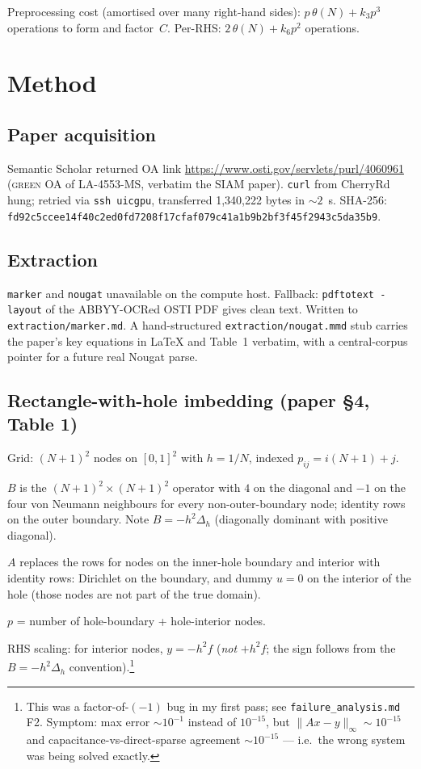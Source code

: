 \documentclass[11pt]{article}
\begin{document}
Preprocessing cost (amortised over many right-hand sides):
$p\,\theta(N) + k_3 p^3$ operations to form and factor~$C$. Per-RHS:
$2\,\theta(N) + k_6 p^2$ operations.

\section{Method}

\subsection{Paper acquisition}
Semantic Scholar returned OA link \url{https://www.osti.gov/servlets/purl/4060961}
(\textsc{green} OA of LA-4553-MS, verbatim the SIAM paper). \texttt{curl}
from CherryRd hung; retried via \texttt{ssh uicgpu}, transferred 1{,}340{,}222
bytes in ${\sim}2$~s. SHA-256:
\lstinline|fd92c5ccee14f40c2ed0fd7208f17cfaf079c41a1b9b2bf3f45f2943c5da35b9|.

\subsection{Extraction}
\texttt{marker} and \texttt{nougat} unavailable on the compute host.
Fallback: \texttt{pdftotext -layout} of the ABBYY-OCRed OSTI PDF gives
clean text. Written to \texttt{extraction/marker.md}. A hand-structured
\texttt{extraction/nougat.mmd} stub carries the paper's key equations in
LaTeX and Table~1 verbatim, with a central-corpus pointer for a future
real Nougat parse.

\subsection{Rectangle-with-hole imbedding (paper \S4, Table 1)}
Grid: $(N+1)^2$ nodes on $[0,1]^2$ with $h = 1/N$, indexed $p_{ij} = i(N+1)+j$.

$B$ is the $(N+1)^2 \times (N+1)^2$ operator with $4$ on the diagonal and
$-1$ on the four von Neumann neighbours for every non-outer-boundary
node; identity rows on the outer boundary. Note $B = -h^2 \Delta_h$
(diagonally dominant with positive diagonal).

$A$ replaces the rows for nodes on the inner-hole boundary
and interior with identity rows: Dirichlet on the boundary, and dummy
$u = 0$ on the interior of the hole (those nodes are not part of the
true domain).

$p$ = number of hole-boundary + hole-interior nodes.

RHS scaling: for interior nodes, $y = -h^2 f$ (\emph{not} $+h^2 f$; the
sign follows from the $B = -h^2 \Delta_h$ convention).\footnote{This was a
factor-of-$(-1)$ bug in my first pass; see \texttt{failure\_analysis.md} F2.
Symptom: max error $\sim 10^{-1}$ instead of $10^{-15}$, but
$\|Ax-y\|_\infty \sim 10^{-15}$ and capacitance-vs-direct-sparse agreement
$\sim 10^{-15}$ --- i.e.\ the wrong system was being solved exactly.}
\end{document}
